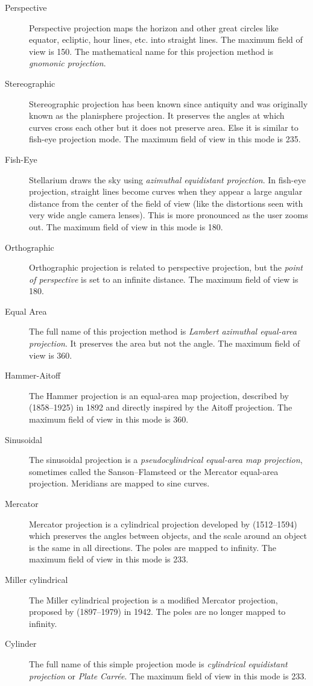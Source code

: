 \begin{description}
  \item[Perspective] Perspective projection maps the horizon and other
    great circles like equator, ecliptic, hour lines, etc. into
    straight lines. The maximum field of view is 150\degree. The
    mathematical name for this projection method is \emph{gnomonic
      projection}.
  \item[Stereographic] Stereographic projection has been known since
    antiquity and was originally known as the planisphere
    projection. It preserves the angles at which curves cross each
    other but it does not preserve area. Else it is similar to
    fish-eye projection mode. The maximum field of view in this mode
    is 235\degree.
  \item[Fish-Eye] Stellarium draws the sky using \emph{azimuthal
    equidistant projection}. In fish-eye projection, straight lines
    become curves when they appear a large angular distance from the
    center of the field of view (like the distortions seen with very
    wide angle camera lenses). This is more pronounced as the user zooms
    out. The maximum field of view in this mode is 180\degree.
  \item[Orthographic] Orthographic projection is related to
    perspective projection, but the \emph{point of perspective} is set
    to an infinite distance. The maximum field of view is 180\degree.
  \item[Equal Area] The full name of this projection method is
    \emph{Lambert azimuthal equal-area projection}. It preserves the
    area but not the angle. The maximum field of view is 360\degree.
  \item[Hammer-Aitoff] The Hammer projection is an equal-area map
    projection, described by  (1858--1925) in 1892 and directly inspired
    by the Aitoff projection. The maximum field of view in this mode is
    360\degree.
  \item[Sinusoidal] The sinusoidal projection is a
    \emph{pseudocylindrical equal-area map projection}, sometimes
    called the Sanson--Flamsteed or the Mercator equal-area
    projection. Meridians are mapped to sine curves.
  \item[Mercator] Mercator projection is a cylindrical projection developed 
    by  (1512--1594)
    which preserves the angles between objects, and the scale around
    an object is the same in all directions. The poles are mapped to
    infinity.  The maximum field of view in this mode is 233\degree.
  \item[Miller cylindrical] The Miller cylindrical projection is a
    modified Mercator projection, proposed by 
    (1897--1979) in 1942. The poles are no longer mapped to
    infinity.
  \item[Cylinder] The full name of this simple projection mode is
    \emph{cylindrical equidistant projection} or \emph{Plate
      Carr\'ee}. The maximum field of view in this mode is 233\degree.
\end{description}

